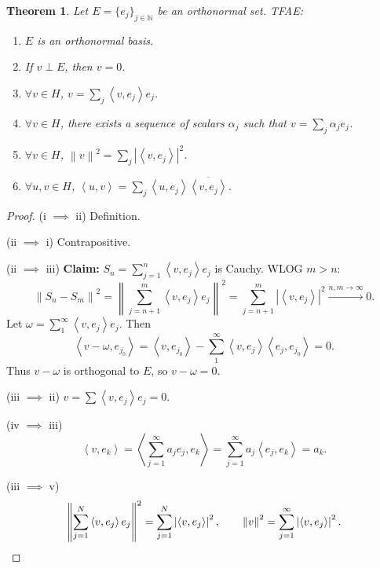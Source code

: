 \documentclass[12pt]{article}
\newcommand{\abs}[1]{\left| #1 \right|}
\newcommand{\norm}[1]{\left\| #1 \right\|}
\newcommand{\ip}[2]{\left\langle #1, #2 \right\rangle}
\newcommand{\N}{\mathbb{N}}
\newtheorem{thm}{Theorem}[section]
\theoremstyle{definition}
\begin{document}
\begin{thm}
	Let $E = \lbrace e_j \rbrace_{j \in \N}$ be an orthonormal set.
	TFAE:
	\begin{enumerate}[label=(\roman*),nosep]
		\item $E$ is an orthonormal basis.
		\item If $v \perp E$, then $v = 0$.
		\item $\forall v \in H$, $v = \sum_j \ip{v}{e_j} e_j$.
		\item $\forall v \in H$, there exists a sequence of scalars $\alpha_j$ such that $v = \sum_j \alpha_j e_j$.
		\item $\forall v \in H$, $\norm{v}^2 = \sum_j \abs{\ip{v}{e_j}}^2$.
		\item $\forall u, v \in H$, $\ip{u}{v} = \sum_j \ip{u}{e_j} \overline{\ip{v}{e_j}}$.
	\end{enumerate}
\end{thm}
\begin{proof}
	(i $\implies$ ii) Definition.

	(ii $\implies$ i) Contrapositive.

	(ii $\implies$ iii) \textbf{Claim: } $S_n = \sum_{j=1}^n \ip{v}{e_j} e_j$ is Cauchy.
	WLOG $m > n$:
	\begin{equation*}
		\norm{S_n - S_m}^2 = \norm{\sum_{j=n+1}^m \ip{v}{e_j} e_j}^2 = \sum_{j=n+1}^m \abs{\ip{v}{e_j}}^2 \xrightarrow{n,m \to \infty} 0.
	\end{equation*}
	Let $\omega = \sum_1^\infty \ip{v}{e_j} e_j$.
	Then
	\begin{equation*}
		\ip{v - \omega}{e_{j_0}} = \ip{v}{e_{j_0}} - \sum_1^\infty \ip{v}{e_j} \ip{e_j}{e_{j_0}} = 0.
	\end{equation*}
	Thus $v - \omega$ is orthogonal to $E$, so $v - \omega = 0$.

	(iii $\implies$ ii) $v = \sum \ip{v}{e_j} e_j = 0$.

	(iv $\implies$ iii)
	\begin{equation*}
		\ip{v}{e_k} = \ip{\sum_{j=1}^\infty a_j e_j}{e_k} = \sum_{j=1}^\infty a_j \ip{e_j}{e_k} = a_k.
	\end{equation*}

	(iii $\implies$ v)
	\begin{equation*}
		\norm{\sum_{j=1}^N \ip{v}{e_j} e_j}^2 = \sum_{j=1}^N \abs{\ip{v}{e_j}}^2, \qquad \norm{v}^2 = \sum_{j=1}^\infty \abs{\ip{v}{e_j}}^2. \qedhere
	\end{equation*}
\end{proof}
\end{document}
